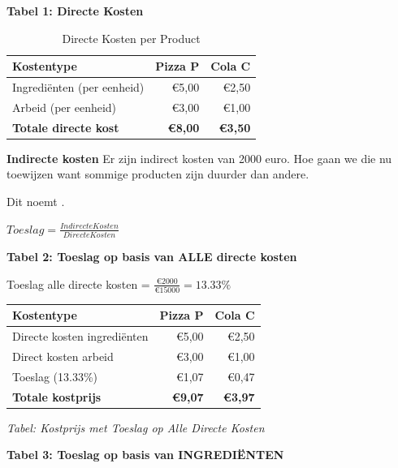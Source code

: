 \documentclass[a4paper,11pt]{article}
\begin{document}
\textbf{Tabel 1: Directe Kosten}

\begin{table}[ht]
    \centering
    \begin{tabular}{|l|r|r|}
        \hline
        \textbf{Kostentype} & \textbf{Pizza P} & \textbf{Cola C} \\
        \hline
        Ingrediënten (per eenheid) & €5,00 & €2,50 \\
        Arbeid (per eenheid) & €3,00 & €1,00 \\
        \hline
        \textbf{Totale directe kost} & \textbf{€8,00} & \textbf{€3,50} \\
        \hline
    \end{tabular}
    \caption{Directe Kosten per Product}
\end{table}

\textbf{Indirecte kosten}
Er zijn indirect kosten van 2000 euro.
Hoe gaan we die nu toewijzen want sommige producten zijn duurder
dan andere.

Dit noemt .

$Toeslag = \frac{Indirecte Kosten}{Directe Kosten}$
\newline

\textbf{Tabel 2: Toeslag op basis van ALLE directe kosten}

Toeslag alle directe kosten = $\frac{\text{€}2000}{\text{€}15000} = 13.33\%$
\newline

\begin{center}
    \begin{tabular}{|l|r|r|}
        \hline
        \textbf{Kostentype} & \textbf{Pizza P} & \textbf{Cola C} \\
        \hline
        Directe kosten ingrediënten & €5,00 & €2,50 \\
        Direct kosten arbeid & €3,00 & €1,00 \\
        Toeslag (13.33\%) & €1,07 & €0,47 \\
        \hline
        \textbf{Totale kostprijs} & \textbf{€9,07} & \textbf{€3,97} \\
        \hline
    \end{tabular}
\end{center}
\label{tab:toeslag_alle_directe_kosten}
\begin{center}\small\emph{Tabel: Kostprijs met Toeslag op Alle Directe Kosten}\end{center}

\textbf{Tabel 3: Toeslag op basis van INGREDIËNTEN}
\end{document}

